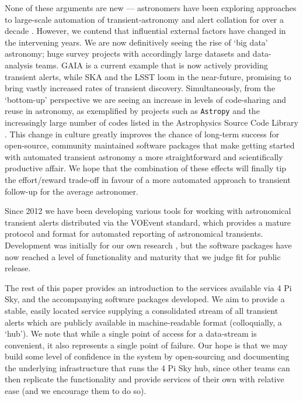 \documentclass[5p,authoryear]{elsarticle}
\begin{document}
None of these arguments are new ---
astronomers have been exploring approaches to large-scale automation of transient-astronomy and alert collation for over a decade \citep[e.g.][]{Allan2004, Williams2010}.
However, we contend that influential external factors have changed in the intervening years.
We are now definitively seeing the rise of `big data' astronomy; huge survey projects with accordingly large datasets and data-analysis teams. 
GAIA \citep{Perryman2001} is a current example that is now actively providing transient alerts, while SKA and the LSST loom in the near-future, promising to bring vastly increased rates of transient discovery. 
Simultaneously, from the `bottom-up' perspective we are seeing an increase in levels of code-sharing and reuse in astronomy, as exemplified by projects such as \texttt{Astropy} \citep{Astropy2013} and the increasingly large number of codes listed in the Astrophysics Source Code Library  \citep{Allen2015}. 
This change in culture greatly improves the chance of long-term success for open-source, community maintained software packages that make getting started with automated transient astronomy a more straightforward and scientifically productive affair.
We hope that the combination of these effects will finally tip the effort/reward trade-off in favour of a more automated approach to transient follow-up for the average astronomer.

Since 2012 we have been developing various tools for working with astronomical transient alerts distributed via the VOEvent standard, which provides a mature protocol and format for automated reporting of astronomical transients. 
Development was initially for our own research \citep[and has contributed to a number of scientific results, e.g.][]{Anderson2014,Fender2015b}, but the software packages have now reached a level of functionality and maturity that we judge fit for public release.


The rest of this paper provides an introduction to the services available via 4 Pi Sky, and the accompanying software packages developed. 
We aim to provide a stable, easily located service supplying a consolidated stream of all transient alerts which are publicly available in machine-readable format (colloquially, a `hub'). 
We note that while a single point of access for a data-stream is convenient, it also represents a single point of failure.
Our hope is that we may build some level of confidence in the system by open-sourcing and documenting the underlying infrastructure that runs the 4 Pi Sky hub, since other teams can then replicate the functionality and provide services of their own with relative ease (and we encourage them to do so).
\end{document}
